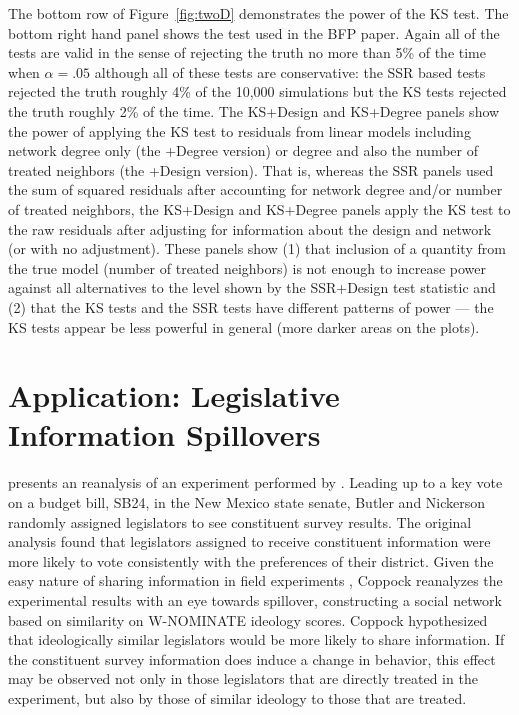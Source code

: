 The bottom row of Figure~\ref{fig:twoD} demonstrates the power of the KS test.
The bottom right hand panel shows the test used in the BFP paper. Again all of the tests
are valid in the sense of rejecting the truth no more than 5\% of the time
when $\alpha=.05$ although all of these tests are conservative: the SSR based
tests rejected the truth roughly 4\% of the 10,000 simulations but the KS
tests rejected the truth roughly 2\% of the time.  The KS+Design and KS+Degree
panels show the power of applying the KS test to residuals from linear models
including network degree only (the +Degree version) or degree and also the
number of treated neighbors (the +Design version). That is, whereas the SSR
panels used the sum of squared residuals after accounting for network degree
and/or number of treated neighbors, the KS+Design and KS+Degree panels apply
the KS test to the raw residuals after adjusting for information about the
design and network (or with no adjustment). These panels show (1) that
inclusion of a quantity from the true model (number of treated neighbors) is
not enough to increase power against all alternatives to the level shown by
the SSR+Design test statistic and (2) that the KS tests and the SSR tests have
different patterns of power --- the KS tests appear be less powerful in general
(more darker areas on the plots).

\section{Application: Legislative Information Spillovers}

\citet{coppock2014information} presents an reanalysis of an experiment performed
by \citet{butler2011can}. Leading up to a key vote on a budget bill, SB24, in the
New Mexico state senate, Butler and Nickerson randomly assigned legislators to see
constituent survey results. The original
analysis found that legislators assigned to receive constituent information were
more likely to vote consistently with the preferences of their district.
Given the easy nature of sharing information in
field experiments \citep{winters2012using},  Coppock reanalyzes the
experimental results with an eye towards spillover, constructing a social
network based on similarity on W-NOMINATE ideology scores. Coppock hypothesized
that ideologically similar legislators would be more likely to share
information. If the constituent survey information does induce a change in behavior, this
effect may be observed not only in those legislators that are directly treated
in the experiment, but also by those of similar ideology to those that are
treated.


